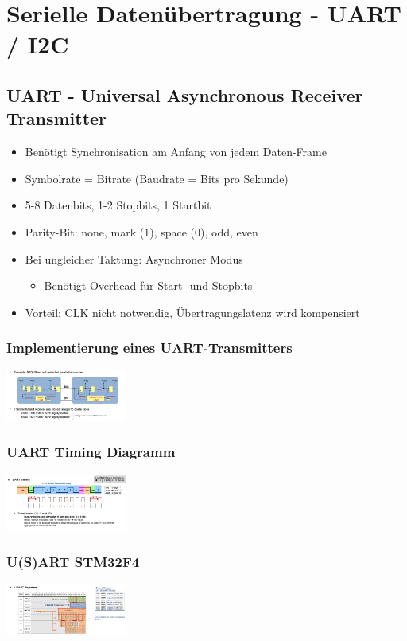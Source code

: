 \section{Serielle Datenübertragung - UART / I2C}
\subsection{UART - Universal Asynchronous Receiver Transmitter}
\begin{itemize}
    \item Benötigt Synchronisation am Anfang von jedem Daten-Frame
    \item Symbolrate = Bitrate (Baudrate = Bits pro Sekunde)
    \item 5-8 Datenbits, 1-2 Stopbits, 1 Startbit
    \item Parity-Bit: none, mark (1), space (0), odd, even
    \item Bei ungleicher Taktung: Asynchroner Modus
    \begin{itemize}
        \item Benötigt Overhead für Start- und Stopbits
    \end{itemize}
    \item Vorteil: CLK nicht notwendig, Übertragungslatenz wird kompensiert
\end{itemize}
\subsubsection{Implementierung eines UART-Transmitters}
\includegraphics[width=0.3\textwidth]{sections/images/uart_impl.png}

\subsubsection{UART Timing Diagramm}
\includegraphics[width=0.3\textwidth]{sections/images/uart_timing.png}

\subsubsection{U(S)ART STM32F4}
\includegraphics[width=0.3\textwidth]{sections/images/uart_registers.png}

